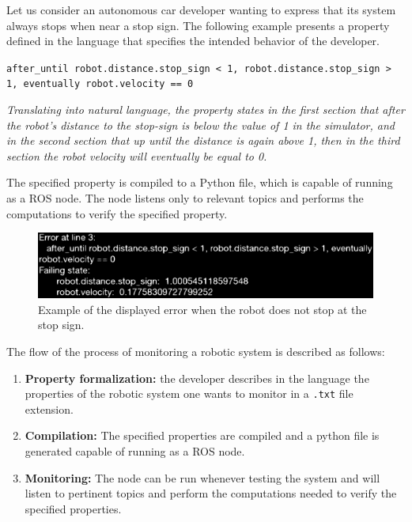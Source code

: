 \documentclass[runningheads]{llncs}
\begin{document}
Let us consider an autonomous car developer wanting to express that its system always stops when near a stop sign. The following example presents a property defined in the language that specifies the intended behavior of the developer.


\vspace{2mm}
\texttt{after\_until robot.distance.stop\_sign < 1, robot.distance.stop\_sign > 1, eventually robot.velocity == 0}
\vspace{2mm}

\textit{Translating into natural language, the property states in the first section that after the robot's distance to the stop-sign is below the value of 1 in the simulator, and in the second section that up until the distance is again above 1, then in the third section the robot velocity will eventually be equal to 0.}
\vspace{2mm}

The specified property is compiled to a Python file, which is capable of running as a ROS node. The node listens only to relevant topics and performs the computations to verify the specified property.

\begin{figure}
\includegraphics[width=\textwidth]{error.eps}
\caption{Example of the displayed error when the robot does not stop at the stop sign.} \label{fig1}
\end{figure}

The flow of the process of monitoring a robotic system is described as follows:

\begin{enumerate}[label=(\roman*)]
    \item \textbf{Property formalization:} the developer describes in the language the properties of the robotic system one wants to monitor in a \texttt{.txt} file extension.
    \item \textbf{Compilation:} The specified properties are compiled and a python file is generated capable of running as a ROS node.
    \item \textbf{Monitoring:} The node can be run whenever testing the system and will listen to pertinent topics and perform the computations needed to verify the specified properties.
\end{enumerate}
\end{document}
